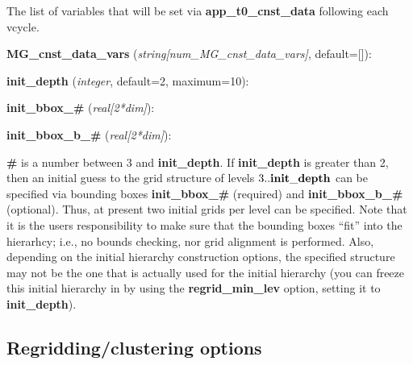 \documentclass[aps,amssymb,unsortedaddress,nofootinbib]{revtex4}
\def\lsep{\itemsep 0.05in}
\begin{document}
\begin{list}{}{\lsep}
      The list of variables that will be set via {\bf app\_t0\_cnst\_data} following
      each vcycle.
\item {\bf MG\_cnst\_data\_vars} ({\em string[num\_MG\_cnst\_data\_vars]}, default=[]):
\item
\item {\bf init\_depth} ({\em integer}, default=2, maximum=10):
\item {\bf init\_bbox\_\#} ({\em real[2*dim]}): 
\item {\bf init\_bbox\_b\_\#} ({\em real[2*dim]}): 
   \begin{list}{}{\lsep}
      \item
      {\bf \#} is a number between 3 and {\bf init\_depth}.
      If {\bf init\_depth} is greater than 2, then an initial guess to the grid structure of 
      levels $3..{\bf init\_depth}$ can be specified via bounding boxes {\bf init\_bbox\_\#} (required) and
      {\bf init\_bbox\_b\_\#} (optional). Thus, at present two initial grids per level can be
      specified. Note that it is the users responsibility to make sure that the bounding
      boxes ``fit'' into the hierarhcy; i.e., no bounds checking, nor grid alignment is performed.
      Also, depending on the initial hierarchy construction options, the specified structure
      may not be the one that is actually used for the initial hierarchy (you can freeze this
      initial hierarchy in by using the {\bf regrid\_min\_lev} option, setting it to {\bf init\_depth}).
   \end{list}
\end{list}

\subsection{Regridding/clustering options}\label{sec_rgc_ops}
\end{document}
